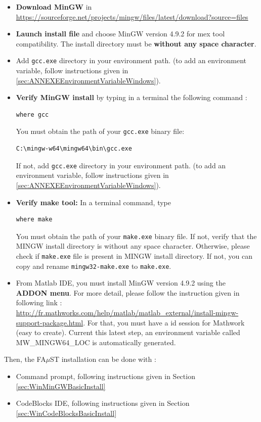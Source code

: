 \begin{itemize}
\item \textbf{Download MinGW} in \url{https://sourceforge.net/projects/mingw/files/latest/download?source=files}
\item \textbf{Launch install file} and choose MinGW version 4.9.2 for mex tool compatibility. The install directory must be \textbf{without any space character}.  
\item Add \texttt{gcc.exe} directory in your environment path. 
(to add an environment variable, follow instructions given in \ref{sec:ANNEXEEnvironmentVariableWindows}). 
\item \textbf{Verify MinGW install} by typing in a terminal the following command : 
\begin{lstlisting}
where gcc
\end{lstlisting}
You must obtain the path of your \texttt{gcc.exe} binary file: 
\begin{lstlisting}
C:\mingw-w64\mingw64\bin\gcc.exe
\end{lstlisting}
If not, add \texttt{gcc.exe} directory in your environment path. 
(to add an environment variable, follow instructions given in \ref{sec:ANNEXEEnvironmentVariableWindows}). 

\item \textbf{Verify make tool:} In a terminal command, type
\begin{lstlisting}
where make
\end{lstlisting}
You must obtain the path of your \texttt{make.exe} binary file. 
If not, verify that the MINGW install directory is without any space character. Otherwise, please check if \texttt{make.exe} file is present in MINGW install directory. If not, you can copy and rename \texttt{mingw32-make.exe} to \texttt{make.exe}.

\item From Matlab IDE, you must install MinGW version 4.9.2 using the \textbf{ADDON menu}. For more detail, please follow the instruction given in following link :  
\url{http://fr.mathworks.com/help/matlab/matlab_external/install-mingw-support-package.html}. For that, you must have a id session for Mathwork (easy to create). Current this latest step, an environment variable called MW\_MINGW64\_LOC is automatically generated. 
\end{itemize}
Then, the FA$\mu$ST installation can be done with :
\begin{itemize}
\item Command prompt, following instructions given in Section \ref{sec:WinMinGWBasicInstall} 
\item CodeBlocks IDE, following instructions given in Section \ref{sec:WinCodeBlocksBasicInstall} 
\end{itemize}



